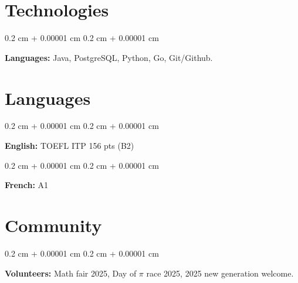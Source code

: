\documentclass[10pt, letterpaper]{article}
\newenvironment{onecolentry}{
    \begin{adjustwidth}{
        0.2 cm + 0.00001 cm
    }{
        0.2 cm + 0.00001 cm
    }
}{
    \end{adjustwidth}
} %
\begin{document}
    \section{Technologies}

        \begin{onecolentry}
            \textbf{Languages:} Java, PostgreSQL, Python, Go, Git/Github.
        \end{onecolentry}

    \section{Languages}

        \begin{onecolentry}
            \textbf{English:} TOEFL ITP 156 pts (B2)
        \end{onecolentry}
        \begin{onecolentry}
            \textbf{French:} A1
        \end{onecolentry}


    \section{\small Community}
        \footnotesize

        \begin{onecolentry}
            \textbf{Volunteers:} Math fair 2025, Day of $\pi$ race 2025, 2025 new generation welcome.
        \end{onecolentry}
\end{document}
